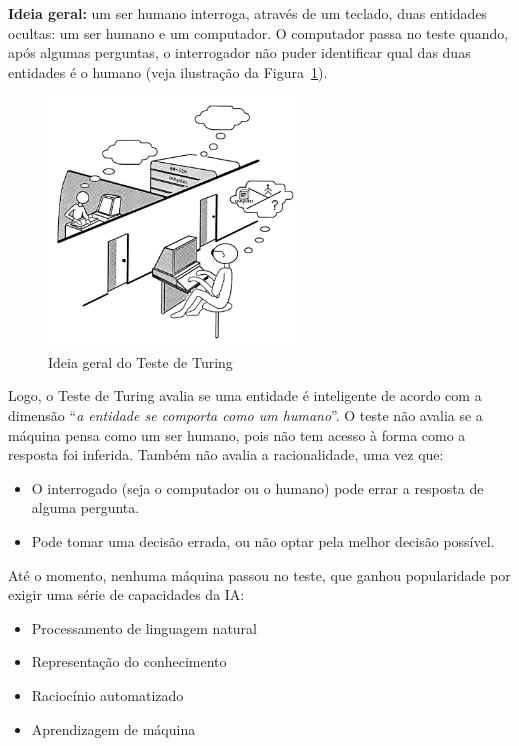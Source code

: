 \textbf{Ideia geral:} um ser humano interroga, através de um teclado, duas entidades ocultas: um ser humano e um computador. O computador passa no teste quando, após algumas perguntas, o interrogador não puder identificar qual das duas entidades é o humano (veja ilustração da Figura~\ref{fig:teste-turing}).

\begin{figure}[H]
	\centering
	\includegraphics[width=0.6\textwidth]{img/teste-turing}
	\caption{Ideia geral do Teste de Turing}
	\label{fig:teste-turing}
\end{figure}

Logo, o Teste de Turing avalia se uma entidade é inteligente de acordo com a dimensão ``\textit{a entidade se comporta como um humano}''. O teste não avalia se a máquina pensa como um ser humano, pois não tem acesso à forma como a resposta foi inferida. Também não avalia a racionalidade, uma vez que:
\begin{itemize}
	\item O interrogado (seja o computador ou o humano) pode errar a resposta de alguma pergunta.
	\item Pode tomar uma decisão errada, ou não optar pela melhor decisão possível.
\end{itemize}

\insertspace

Até o momento, nenhuma máquina passou no teste, que ganhou popularidade por exigir uma série de capacidades da IA:
\begin{itemize}
	\item Processamento de linguagem natural
	\item Representação do conhecimento
	\item Raciocínio automatizado
	\item Aprendizagem de máquina
\end{itemize}
	

